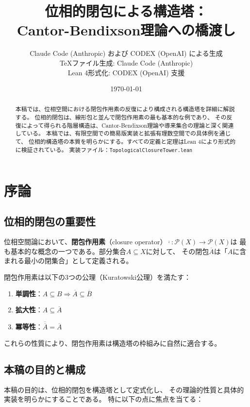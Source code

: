 \documentclass[a4paper,12pt]{ltjsarticle}
\title{位相的閉包による構造塔：\\Cantor-Bendixson理論への橋渡し}
\author{Claude Code (Anthropic) および CODEX (OpenAI) による生成\\
\small TeXファイル生成: Claude Code (Anthropic)\\
\small Lean 4形式化: CODEX (OpenAI) 支援}
\date{\today}
\theoremstyle{definition}
\begin{document}
\maketitle

\begin{abstract}
本稿では、位相空間における閉包作用素の反復により構成される構造塔を詳細に解説する。
位相的閉包は、線形包と並んで閉包作用素の最も基本的な例であり、
その反復によって得られる階層構造は、Cantor-Bendixson理論や導来集合の理論と深く関連している。
本稿では、有限空間での簡易版実装と拡張有理数空間での具体例を通じて、
位相的構造塔の本質を明らかにする。すべての定義と定理はLean 4により形式的に検証されている。
実装ファイル：\texttt{TopologicalClosureTower.lean}
\end{abstract}

\tableofcontents

\section{序論}

\subsection{位相的閉包の重要性}

位相空間論において、\textbf{閉包作用素}（closure operator）$\overline{\cdot}: \mathcal{P}(X) \to \mathcal{P}(X)$は
最も基本的な概念の一つである。部分集合$A \subseteq X$に対して、
その閉包$\overline{A}$は「$A$に含まれる最小の閉集合」として定義される。

閉包作用素は以下の3つの公理（Kuratowski公理）を満たす：

\begin{enumerate}[label=(\roman*)]
\item \textbf{単調性}：$A \subseteq B \Rightarrow \overline{A} \subseteq \overline{B}$
\item \textbf{拡大性}：$A \subseteq \overline{A}$
\item \textbf{冪等性}：$\overline{\overline{A}} = \overline{A}$
\end{enumerate}

これらの性質により、閉包作用素は構造塔の枠組みに自然に適合する。

\subsection{本稿の目的と構成}

本稿の目的は、位相的閉包を構造塔として定式化し、
その理論的性質と具体的実装を明らかにすることである。
特に以下の点に焦点を当てる：
\end{document}
